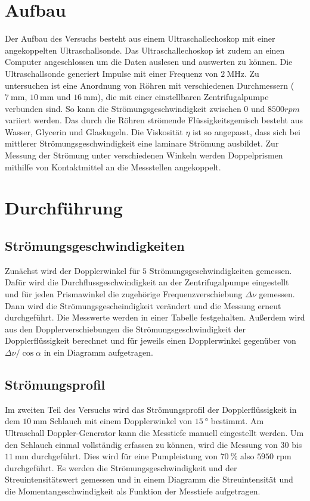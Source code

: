 \section{Aufbau}
\label{sec:Aufbau}
Der Aufbau des Versuchs besteht aus einem Ultraschallechoskop mit einer angekoppelten Ultraschallsonde. Das Ultraschallechoskop
ist zudem an einen Computer angeschlossen um die Daten auslesen und auswerten zu können.
Die Ultraschallsonde generiert Impulse mit einer Frequenz von $\qty{2}{\mega\hertz}$.
Zu untersuchen ist eine Anordnung von Röhren mit verschiedenen Durchmessern ($\qty{7}{\milli\meter}$, $\qty{10}{\milli\meter}$ und $\qty{16}{\milli\meter}$), die mit einer einstellbaren
Zentrifugalpumpe verbunden sind. So kann die Strömungsgeschwindigkeit zwischen $0$ und $8500 rpm$ variiert werden.
Das durch die Röhren strömende Flüssigkeitsgemisch besteht aus Wasser, Glycerin und Glaskugeln.
Die Viskosität $\eta$ ist so angepasst, dass sich bei mittlerer Strömungsgeschwindigkeit eine laminare Strömung ausbildet.
Zur Messung der Strömung unter verschiedenen Winkeln werden Doppelprismen mithilfe von Kontaktmittel an die Messstellen
angekoppelt.\\

\section{Durchführung}
\label{sec:Durchführung}
\subsection{Strömungsgeschwindigkeiten}
\label{sub:Strömungsgeschwindigkeiten_durch}
Zunächst wird der Dopplerwinkel für $5$ Strömungsgeschwindigkeiten gemessen.
Dafür wird die Durchflussgeschwindigkeit an der Zentrifugalpumpe eingestellt und für jeden Prismawinkel die
zugehörige Frequenzverschiebung $\Delta \nu$ gemessen. 
Dann wird die Strömungsgescheindigkeit verändert und die Messung erneut durchgeführt.
Die Messwerte werden in einer Tabelle festgehalten.
Außerdem wird aus den Dopplerverschiebungen die Strömungsgeschwindigkeit der Dopplerflüssigkeit berechnet und 
für jeweils einen Dopplerwinkel gegenüber von $\Delta \nu / \cos{\alpha}$ in ein Diagramm aufgetragen.\\

\subsection{Strömungsprofil}
\label{sub:Strömungsprofil_durch}
Im zweiten Teil des Versuchs wird das Strömungsprofil der Dopplerflüssigkeit in dem $\qty{10}{\milli\meter}$ Schlauch mit einem Dopplerwinkel
von $\qty{15}{\degree}$ bestimmt.
Am Ultraschall Doppler-Generator kann die Messtiefe manuell eingestellt werden. Um den Schlauch einmal vollständig
erfassen zu können, wird die Messung von $30$ bis $\qty{11}{\milli\meter}$ durchgeführt. Dies wird für eine
Pumpleistung von $\qty{70}{\percent}$ also $5950$ rpm durchgeführt.
Es werden die Strömungsgeschwindigkeit und der Streuintensitätswert gemessen und in einem Diagramm die
Streuintensität und die Momentangeschwindigkeit als Funktion der Messtiefe aufgetragen.

